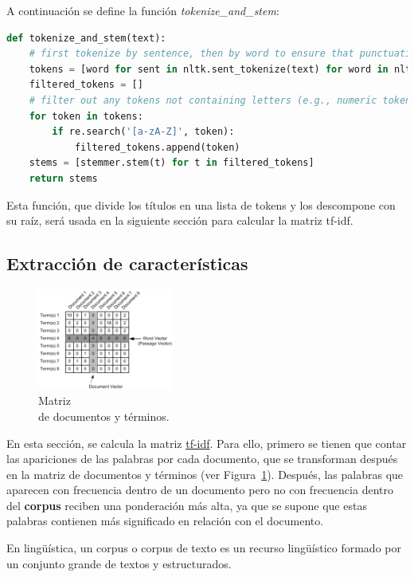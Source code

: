\documentclass{uimppracticas}
\begin{document}
A continuación se define la función \textit{tokenize\_and\_stem}: 

\begin{lstlisting}[language=python]
def tokenize_and_stem(text):
	# first tokenize by sentence, then by word to ensure that punctuation is caught as it's own token
	tokens = [word for sent in nltk.sent_tokenize(text) for word in nltk.word_tokenize(sent)]
	filtered_tokens = []
	# filter out any tokens not containing letters (e.g., numeric tokens, raw punctuation)
	for token in tokens:
		if re.search('[a-zA-Z]', token):
			filtered_tokens.append(token)
	stems = [stemmer.stem(t) for t in filtered_tokens]
	return stems  
\end{lstlisting}

Esta función, que divide los títulos en una lista de tokens y los descompone con su raíz, será usada en la siguiente sección para calcular la matriz tf-idf.
 
\subsection{Extracción de características}

\begin{figure}
	\centering
	\includegraphics[width=0.4\textwidth]{images/matrix}
	\caption{Matriz \\ de documentos y términos.}
	\label{matrix}
\end{figure}

En esta sección, se calcula la matriz \href{https://es.wikipedia.org/wiki/Tf-idf}{tf-idf}. Para ello, primero se tienen que contar las apariciones de las palabras por cada documento, que se transforman después en la matriz de documentos y términos (ver Figura~\ref{matrix}). Después, las palabras que aparecen con frecuencia dentro de un documento pero no con frecuencia dentro del \textbf{corpus} reciben una ponderación más alta, ya que se supone que estas palabras contienen más significado en relación con el documento.

\begin{definition}\label{corpus}
En lingüística, un corpus o corpus de texto es un recurso lingüístico formado por un conjunto grande de textos y estructurados.
\end{definition}
\end{document}
